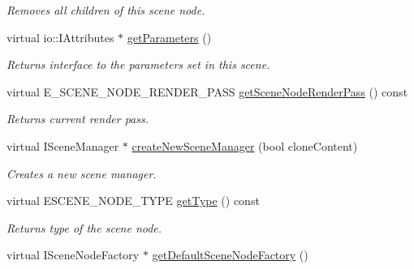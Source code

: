 \begin{DoxyCompactItemize}
\begin{DoxyCompactList}\small\item\em Removes all children of this scene node. \end{DoxyCompactList}\item 
\hypertarget{classirr_1_1scene_1_1_c_scene_manager_a793b237d2c9146ad9b960cac20e891f2}{virtual io\-::\-I\-Attributes $\ast$ \hyperlink{classirr_1_1scene_1_1_c_scene_manager_a793b237d2c9146ad9b960cac20e891f2}{get\-Parameters} ()}\label{classirr_1_1scene_1_1_c_scene_manager_a793b237d2c9146ad9b960cac20e891f2}

\begin{DoxyCompactList}\small\item\em Returns interface to the parameters set in this scene. \end{DoxyCompactList}\item 
\hypertarget{classirr_1_1scene_1_1_c_scene_manager_a1b19cd9536adadf1868ed70edc1a1922}{virtual E\-\_\-\-S\-C\-E\-N\-E\-\_\-\-N\-O\-D\-E\-\_\-\-R\-E\-N\-D\-E\-R\-\_\-\-P\-A\-S\-S \hyperlink{classirr_1_1scene_1_1_c_scene_manager_a1b19cd9536adadf1868ed70edc1a1922}{get\-Scene\-Node\-Render\-Pass} () const }\label{classirr_1_1scene_1_1_c_scene_manager_a1b19cd9536adadf1868ed70edc1a1922}

\begin{DoxyCompactList}\small\item\em Returns current render pass. \end{DoxyCompactList}\item 
\hypertarget{classirr_1_1scene_1_1_c_scene_manager_a973340ede72e07d571793fe3af40d342}{virtual I\-Scene\-Manager $\ast$ \hyperlink{classirr_1_1scene_1_1_c_scene_manager_a973340ede72e07d571793fe3af40d342}{create\-New\-Scene\-Manager} (bool clone\-Content)}\label{classirr_1_1scene_1_1_c_scene_manager_a973340ede72e07d571793fe3af40d342}

\begin{DoxyCompactList}\small\item\em Creates a new scene manager. \end{DoxyCompactList}\item 
\hypertarget{classirr_1_1scene_1_1_c_scene_manager_aac61e8384dd984b8b68db3ca7da0c9df}{virtual E\-S\-C\-E\-N\-E\-\_\-\-N\-O\-D\-E\-\_\-\-T\-Y\-P\-E \hyperlink{classirr_1_1scene_1_1_c_scene_manager_aac61e8384dd984b8b68db3ca7da0c9df}{get\-Type} () const }\label{classirr_1_1scene_1_1_c_scene_manager_aac61e8384dd984b8b68db3ca7da0c9df}

\begin{DoxyCompactList}\small\item\em Returns type of the scene node. \end{DoxyCompactList}\item 
\hypertarget{classirr_1_1scene_1_1_c_scene_manager_a29e52b0ea9d00c78d24443d5eff4f599}{virtual I\-Scene\-Node\-Factory $\ast$ \hyperlink{classirr_1_1scene_1_1_c_scene_manager_a29e52b0ea9d00c78d24443d5eff4f599}{get\-Default\-Scene\-Node\-Factory} ()}\label{classirr_1_1scene_1_1_c_scene_manager_a29e52b0ea9d00c78d24443d5eff4f599}


\end{DoxyCompactItemize}
